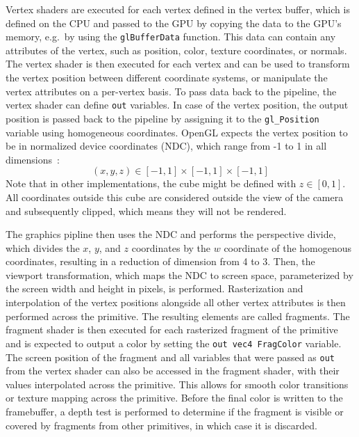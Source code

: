 Vertex shaders are executed for each vertex defined in the vertex buffer, which is defined on the CPU and
passed to the GPU by copying the data to the GPU's memory, e.g.\ by using the \texttt{glBufferData} function.
This data can contain any attributes of the vertex, such as position, color, texture coordinates, or normals.
The vertex shader is then executed for each vertex and can be used to transform the vertex position between different coordinate systems,
or manipulate the vertex attributes on a per-vertex basis.
To pass data back to the pipeline, the vertex shader can define \texttt{out} variables.
In case of the vertex position, the output position is passed back to the
pipeline by assigning it to the \texttt{gl\_Position} variable using homogeneous coordinates.
OpenGL expects the vertex position to be in normalized device coordinates (NDC),
which range from -1 to 1 in all dimensions~\cite{dorner_virtual_2019}:
\begin{equation}
    (x, y, z) \in [-1, 1] \times [-1, 1] \times [-1, 1]
\end{equation}
Note that in other implementations, the cube might be defined with $z \in [0, 1]$.
All coordinates outside this cube are considered outside the view of the camera and subsequently clipped,
which means they will not be rendered.

The graphics pipline then uses the NDC and performs the perspective divide,
which divides the $x$, $y$, and $z$ coordinates by the $w$ coordinate of the homogenous coordinates,
resulting in a reduction of dimension from 4 to 3.
Then, the viewport transformation, which maps the NDC to screen space,
parameterized by the screen width and height in pixels, is performed.
Rasterization and interpolation of the vertex positions alongside all other vertex attributes
is then performed across the primitive.
The resulting elements are called fragments.
The fragment shader is then executed for each rasterized fragment of the primitive and is expected to
output a color by setting the \texttt{out vec4 FragColor} variable.
The screen position of the fragment and all variables that were passed as \texttt{out} from the
vertex shader can also be accessed in the fragment shader, with their values interpolated across the primitive.
This allows for smooth color transitions or texture mapping across the primitive.
Before the final color is written to the framebuffer,
a depth test is performed to determine if the fragment is visible or covered by fragments from other primitives,
in which case it is discarded.


